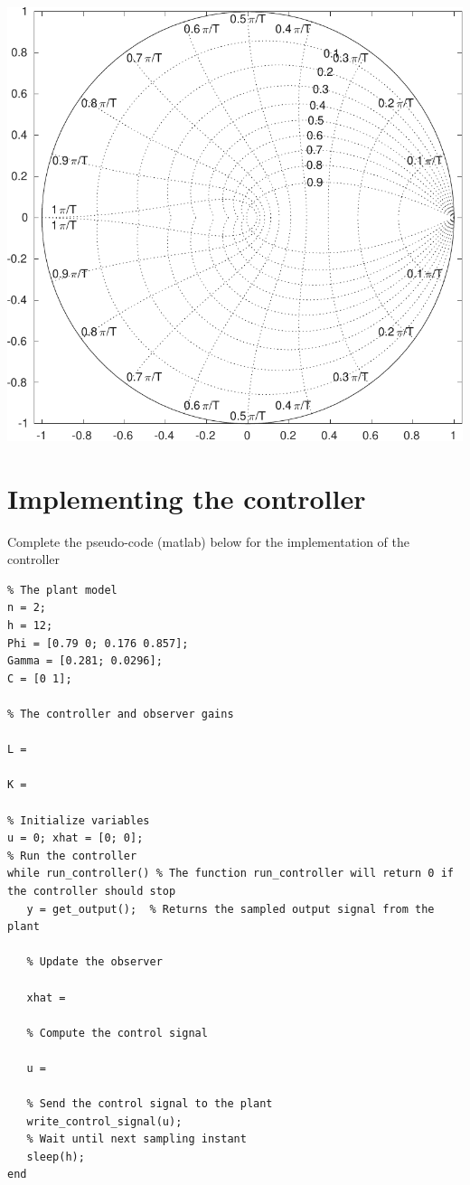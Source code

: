 \documentclass[letterpaper]{scrartcl}
\begin{document}
\begin{center}
\includegraphics[width=0.45\linewidth]{../figures/zgrid-crop}
\end{center}

\newpage 

\section*{Implementing the controller}
\label{sec-4}
Complete the pseudo-code (matlab) below for the implementation of the controller
\begin{verbatim}
% The plant model
n = 2;
h = 12; 
Phi = [0.79 0; 0.176 0.857]; 
Gamma = [0.281; 0.0296];
C = [0 1];

% The controller and observer gains

L = 

K = 

% Initialize variables
u = 0; xhat = [0; 0];
% Run the controller 
while run_controller() % The function run_controller will return 0 if the controller should stop
   y = get_output();  % Returns the sampled output signal from the plant

   % Update the observer

   xhat = 

   % Compute the control signal

   u = 

   % Send the control signal to the plant
   write_control_signal(u);
   % Wait until next sampling instant
   sleep(h);
end
\end{verbatim}
\end{document}
